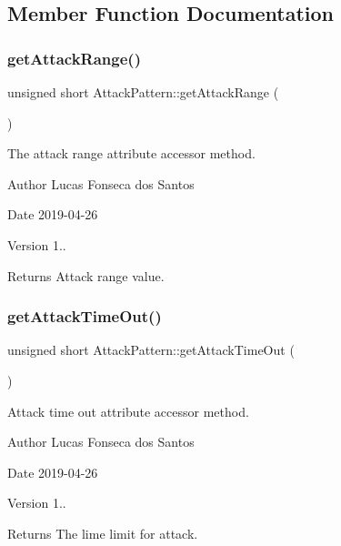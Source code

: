\subsection{Member Function Documentation}
\mbox{\label{classAttackPattern_adcc7cb0abec4c18c22036123aba0458f}} 
\subsubsection{\texorpdfstring{get\+Attack\+Range()}{getAttackRange()}}
{\footnotesize\ttfamily unsigned short Attack\+Pattern\+::get\+Attack\+Range (\begin{DoxyParamCaption}{ }\end{DoxyParamCaption})}

The attack range attribute accessor method. \begin{DoxyAuthor}{Author}
Lucas Fonseca dos Santos 
\end{DoxyAuthor}
\begin{DoxyDate}{Date}
2019-\/04-\/26 
\end{DoxyDate}
\begin{DoxyVersion}{Version}
1..
\end{DoxyVersion}
\begin{DoxyReturn}{Returns}
Attack range value. 
\end{DoxyReturn}
\mbox{\label{classAttackPattern_a85cf1abe2ba86e11d65400d3807e7b1d}} 
\subsubsection{\texorpdfstring{get\+Attack\+Time\+Out()}{getAttackTimeOut()}}
{\footnotesize\ttfamily unsigned short Attack\+Pattern\+::get\+Attack\+Time\+Out (\begin{DoxyParamCaption}{ }\end{DoxyParamCaption})}

Attack time out attribute accessor method. \begin{DoxyAuthor}{Author}
Lucas Fonseca dos Santos 
\end{DoxyAuthor}
\begin{DoxyDate}{Date}
2019-\/04-\/26 
\end{DoxyDate}
\begin{DoxyVersion}{Version}
1..
\end{DoxyVersion}
\begin{DoxyReturn}{Returns}
The lime limit for attack. 
\end{DoxyReturn}
\mbox{\label{classAttackPattern_a92740ff35a3b4f1edd13a41d84ea7045}} 
